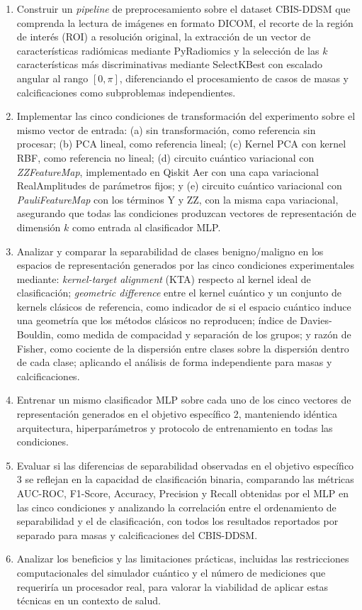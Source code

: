 \begin{enumerate}
  \item Construir un \textit{pipeline} de preprocesamiento sobre el dataset CBIS-DDSM que comprenda
  la lectura de imágenes en formato DICOM, el recorte de la región de interés (ROI) a resolución
  original, la extracción de un vector de características radiómicas mediante PyRadiomics y la
  selección de las $k$ características más discriminativas mediante SelectKBest con escalado
  angular al rango $[0,\pi]$, diferenciando el procesamiento de casos de masas y calcificaciones
  como subproblemas independientes.
  \item Implementar las cinco condiciones de transformación del experimento sobre el mismo vector
  de entrada: (a) sin transformación, como referencia sin procesar; (b) PCA lineal, como referencia
  lineal; (c) Kernel PCA con kernel RBF, como referencia no lineal; (d) circuito cuántico
  variacional con \textit{ZZFeatureMap}, implementado en Qiskit Aer con una capa variacional
  RealAmplitudes de parámetros fijos; y (e) circuito cuántico variacional con
  \textit{PauliFeatureMap} con los términos Y y ZZ, con la misma capa variacional, asegurando que
  todas las condiciones produzcan vectores de representación de dimensión $k$ como entrada al
  clasificador MLP.
  \item Analizar y comparar la separabilidad de clases benigno/maligno en los espacios de
  representación generados por las cinco condiciones experimentales mediante: \textit{kernel-target
  alignment} (KTA) respecto al kernel ideal de clasificación; \textit{geometric difference} entre el
  kernel cuántico y un conjunto de kernels clásicos de referencia, como indicador de si el espacio
  cuántico induce una geometría que los métodos clásicos no reproducen; índice de Davies-Bouldin,
  como medida de compacidad y separación de los grupos; y razón de Fisher, como cociente de la
  dispersión entre clases sobre la dispersión dentro de cada clase; aplicando el análisis de forma
  independiente para masas y calcificaciones.
  \item Entrenar un mismo clasificador MLP sobre cada uno de los cinco vectores de representación
  generados en el objetivo específico 2, manteniendo idéntica arquitectura, hiperparámetros y
  protocolo de entrenamiento en todas las condiciones.
  \item Evaluar si las diferencias de separabilidad observadas en el objetivo específico 3 se
  reflejan en la capacidad de clasificación binaria, comparando las métricas AUC-ROC, F1-Score,
  Accuracy, Precision y Recall obtenidas por el MLP en las cinco condiciones y analizando la
  correlación entre el ordenamiento de separabilidad y el de clasificación, con todos los resultados
  reportados por separado para masas y calcificaciones del CBIS-DDSM.
  \item Analizar los beneficios y las limitaciones prácticas, incluidas las restricciones
  computacionales del simulador cuántico y el número de mediciones que requeriría un procesador
  real, para valorar la viabilidad de aplicar estas técnicas en un contexto de salud.
\end{enumerate}
